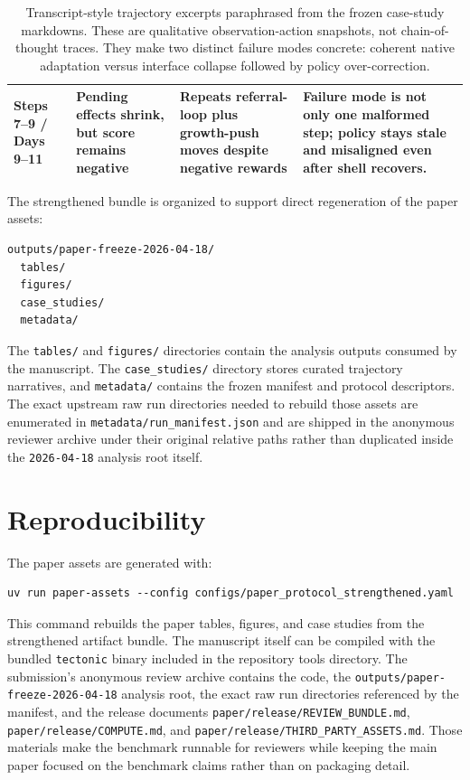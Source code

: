 \begin{table}[tbp]
\begin{tabular}{p{}p{}p{}p{}}
    Steps 7--9 / Days 9--11 & Pending effects shrink, but score remains negative & Repeats referral-loop plus growth-push moves despite negative rewards & Failure mode is not only one malformed step; policy stays stale and misaligned even after shell recovers. \\
    \bottomrule
  \end{tabular}
  \caption{Transcript-style trajectory excerpts paraphrased from the frozen
  case-study markdowns. These are qualitative observation-action snapshots,
  not chain-of-thought traces. They make two distinct failure modes concrete:
  coherent native adaptation versus interface collapse followed by policy
  over-correction.}
  \label{tab:trajectory-excerpts}
\end{table}

The strengthened bundle is organized to support direct regeneration of the
paper assets:

\begin{verbatim}
outputs/paper-freeze-2026-04-18/
  tables/
  figures/
  case_studies/
  metadata/
\end{verbatim}

The \texttt{tables/} and \texttt{figures/} directories contain the analysis
outputs consumed by the manuscript. The \texttt{case\_studies/} directory
stores curated trajectory narratives, and \texttt{metadata/} contains the
frozen manifest and protocol descriptors. The exact upstream raw run
directories needed to rebuild those assets are enumerated in
\texttt{metadata/run\_manifest.json} and are shipped in the anonymous reviewer
archive under their original relative paths rather than duplicated inside the
\texttt{2026-04-18} analysis root itself.

\section{Reproducibility}

The paper assets are generated with:

\begin{verbatim}
uv run paper-assets --config configs/paper_protocol_strengthened.yaml
\end{verbatim}

This command rebuilds the paper tables, figures, and case studies from the
strengthened artifact bundle. The manuscript itself can be compiled with the
bundled \texttt{tectonic} binary included in the repository tools directory.
The submission's anonymous review archive contains the code, the
\texttt{outputs/paper-freeze-2026-04-18} analysis root, the exact raw run
directories referenced by the manifest, and the release documents
\texttt{paper/release/REVIEW\_BUNDLE.md}, \texttt{paper/release/COMPUTE.md},
and \texttt{paper/release/THIRD\_PARTY\_ASSETS.md}. Those materials make the
benchmark runnable for reviewers while keeping the main paper focused on the
benchmark claims rather than on packaging detail.

